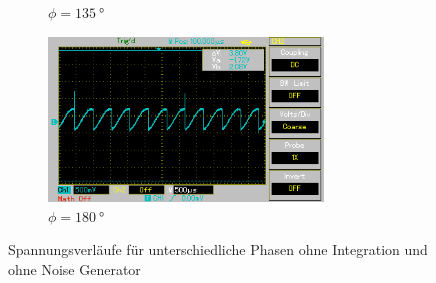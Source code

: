 \begin{figure}[H]
\begin{subfigure}{0.5\textwidth}
    \caption{$\phi = \qty[]{135}{\degree}$}%
    \label{fig:phase4}%
    \end{subfigure}%
    \hfill
    \begin{subfigure}{0.5\textwidth}%
    \centering%
    \includegraphics[width = 7.3cm]{./Oszilloskop Bilder/png/5.2/5 MAP006.png}%
    \caption{$\phi = \qty[]{180}{\degree}$}%
    \label{fig:phase5}%
    \end{subfigure}%
    \caption{Spannungsverläufe für unterschiedliche Phasen ohne Integration und ohne Noise Generator}%
    \label{fig:phasenunterschiede_ohne_noise}%
\end{figure}%
%  
%
%

